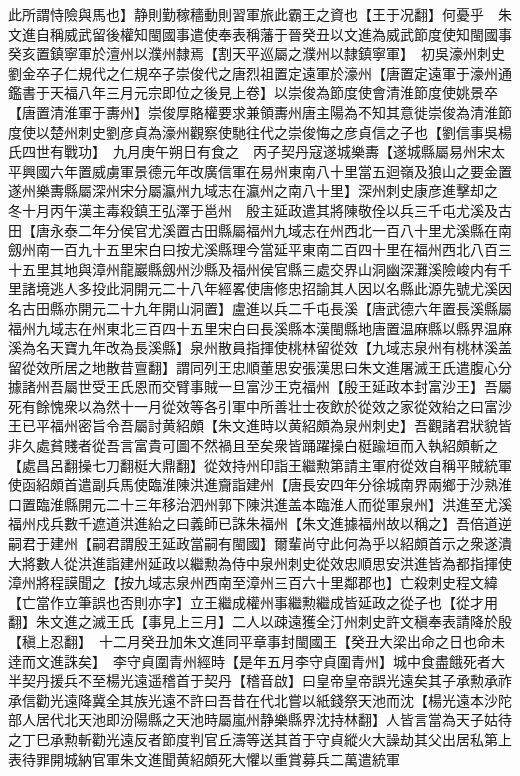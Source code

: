 此所謂恃險與馬也】静則勤稼穡動則習軍旅此霸王之資也【王于况翻】何憂乎　朱文進自稱威武留後權知閩國事遣使奉表稱藩于晉癸丑以文進為威武節度使知閩國事　癸亥置鎮寧軍於澶州以濮州隸焉【割天平巡屬之濮州以隸鎮寧軍】　初吳濠州刺史劉金卒子仁規代之仁規卒子崇俊代之唐烈祖置定遠軍於濠州【唐置定遠軍于濠州通鑑書于天福八年三月元宗即位之後見上卷】以崇俊為節度使會清淮節度使姚景卒【唐置清淮軍于夀州】崇俊厚賂權要求兼領夀州唐主陽為不知其意徙崇俊為清淮節度使以楚州刺史劉彦貞為濠州觀察使馳往代之崇俊悔之彦貞信之子也【劉信事吳楊氏四世有戰功】　九月庚午朔日有食之　丙子契丹寇遂城樂夀【遂城縣屬易州宋太平興國六年置威虜軍景德元年改廣信軍在易州東南八十里當五迴嶺及狼山之要金置遂州樂夀縣屬深州宋分屬瀛州九域志在瀛州之南八十里】深州刺史康彦進擊却之　冬十月丙午漢主毒殺鎮王弘澤于邕州　殷主延政遣其將陳敬佺以兵三千屯尤溪及古田【唐永泰二年分侯官尤溪置古田縣屬福州九域志在州西北一百八十里尤溪縣在南劔州南一百九十五里宋白曰按尤溪縣理今當延平東南二百四十里在福州西北八百三十五里其地與漳州龍巖縣劔州沙縣及福州侯官縣三處交界山洞幽深灘溪險峻内有千里諸境逃人多投此洞開元二十八年經畧使唐修忠招諭其人因以名縣此源先號尤溪因名古田縣亦開元二十九年開山洞置】盧進以兵二千屯長溪【唐武德六年置長溪縣屬福州九域志在州東北三百四十五里宋白曰長溪縣本漢閩縣地唐置温麻縣以縣界温麻溪為名天寶九年改為長溪縣】泉州散員指揮使桃林留從效【九域志泉州有桃林溪盖留從效所居之地散昔亶翻】謂同列王忠順董思安張漢思曰朱文進屠滅王氏遣腹心分據諸州吾屬世受王氏恩而交臂事賊一旦富沙王克福州【殷王延政本封富沙王】吾屬死有餘愧衆以為然十一月從效等各引軍中所善壮士夜飲於從效之家從效紿之曰富沙王已平福州密旨令吾屬討黄紹頗【朱文進時以黄紹頗為泉州刺史】吾觀諸君狀貌皆非久處貧賤者從吾言富貴可圖不然禍且至矣衆皆踊躍操白梃踰垣而入執紹頗斬之【處昌呂翻操七刀翻梃大鼎翻】從效持州印詣王繼勲第請主軍府從效自稱平賊統軍使函紹頗首遣副兵馬使臨淮陳洪進齎詣建州【唐長安四年分徐城南界兩鄉于沙熟淮口置臨淮縣開元二十三年移治泗州郭下陳洪進盖本臨淮人而從軍泉州】洪進至尤溪福州戍兵數千遮道洪進紿之曰義師已誅朱福州【朱文進據福州故以稱之】吾倍道逆嗣君于建州【嗣君謂殷王延政當嗣有閩國】爾輩尚守此何為乎以紹頗首示之衆遂潰大將數人從洪進詣建州延政以繼勲為侍中泉州刺史從效忠順思安洪進皆為都指揮使漳州將程謨聞之【按九域志泉州西南至漳州三百六十里鄰郡也】亡殺刺史程文緯【亡當作立筆誤也否則亦字】立王繼成權州事繼勲繼成皆延政之從子也【從才用翻】朱文進之滅王氏【事見上三月】二人以疎遠獲全汀州刺史許文稹奉表請降於殷【稹上忍翻】　十二月癸丑加朱文進同平章事封閩國王【癸丑大梁出命之日也命未逹而文進誅矣】　李守貞圍青州經時【是年五月李守貞圍青州】城中食盡餓死者大半契丹援兵不至楊光遠遥稽首于契丹【稽音啟】曰皇帝皇帝誤光遠矣其子承勲承祚承信勸光遠降冀全其族光遠不許曰吾昔在代北嘗以紙錢祭天池而沈【楊光遠本沙陀部人居代北天池即汾陽縣之天池時屬嵐州静樂縣界沈持林翻】人皆言當為天子姑待之丁巳承勲斬勸光遠反者節度判官丘濤等送其首于守貞縱火大譟劫其父出居私第上表待罪開城納官軍朱文進聞黄紹頗死大懼以重賞募兵二萬遣統軍

